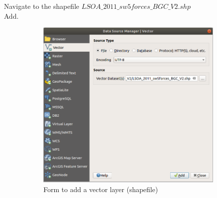 Navigate to the shapefile $LSOA\_2011\_sw5forces\_BGC\_V2.shp$\\
Add.\\


\begin{figure}[h!] %
	\begin{subfigure}{0.45\textwidth}
		\includegraphics[width=\linewidth]{images/data_source_manager_window.png}
		\caption{Form to add a vector layer (shapefile)} \label{ft_fig_firstfig3}
	\end{subfigure}\hspace*{\fill}
	\begin{subfigure}{0.3\textwidth}

\end{subfigure}
\end{figure}
